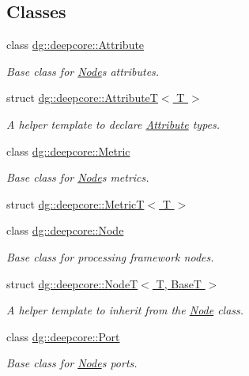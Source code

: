 \subsection*{Classes}
\begin{DoxyCompactItemize}
\item 
class \hyperlink{classdg_1_1deepcore_1_1_attribute}{dg\+::deepcore\+::\+Attribute}
\begin{DoxyCompactList}\small\item\em Base class for \hyperlink{classdg_1_1deepcore_1_1_node}{Node}\textquotesingle{}s attributes. \end{DoxyCompactList}\item 
struct \hyperlink{structdg_1_1deepcore_1_1_attribute_t}{dg\+::deepcore\+::\+Attribute\+T$<$ T $>$}
\begin{DoxyCompactList}\small\item\em A helper template to declare \hyperlink{classdg_1_1deepcore_1_1_attribute}{Attribute} types. \end{DoxyCompactList}\item 
class \hyperlink{classdg_1_1deepcore_1_1_metric}{dg\+::deepcore\+::\+Metric}
\begin{DoxyCompactList}\small\item\em Base class for \hyperlink{classdg_1_1deepcore_1_1_node}{Node}\textquotesingle{}s metrics. \end{DoxyCompactList}\item 
struct \hyperlink{structdg_1_1deepcore_1_1_metric_t}{dg\+::deepcore\+::\+Metric\+T$<$ T $>$}
\item 
class \hyperlink{classdg_1_1deepcore_1_1_node}{dg\+::deepcore\+::\+Node}
\begin{DoxyCompactList}\small\item\em Base class for processing framework nodes. \end{DoxyCompactList}\item 
struct \hyperlink{structdg_1_1deepcore_1_1_node_t}{dg\+::deepcore\+::\+Node\+T$<$ T, Base\+T $>$}
\begin{DoxyCompactList}\small\item\em A helper template to inherit from the \hyperlink{classdg_1_1deepcore_1_1_node}{Node} class. \end{DoxyCompactList}\item 
class \hyperlink{classdg_1_1deepcore_1_1_port}{dg\+::deepcore\+::\+Port}
\begin{DoxyCompactList}\small\item\em Base class for \hyperlink{classdg_1_1deepcore_1_1_node}{Node}\textquotesingle{}s ports. \end{DoxyCompactList}\item 

\end{DoxyCompactItemize}
